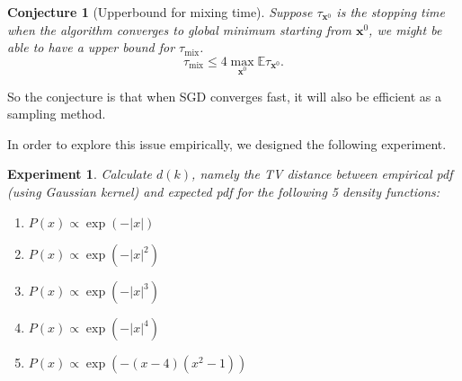 \documentclass[preprint,12pt,3p]{elsarticle}
\newcommand{\bx}{\mathbf{x}}
\newcommand{\E}{\mathbb{E}}
\newtheorem{conjecture}{Conjecture}
\newtheorem{experiment}{Experiment}
\begin{document}
\begin{conjecture}[Upperbound for mixing time] Suppose $\tau_{\bx^0}$ is the stopping time when the algorithm converges to global minimum starting from $\bx^0$, we might be able to have a upper bound for $\tau_{\mathrm{mix}}$.
\[
\tau_{\mathrm{mix}} \leq 4 \max_{\bx^0}\E \tau_{\bx^0}.
\]
\end{conjecture}

So the conjecture is that when SGD converges fast, it will also be efficient as a sampling method.

In order to explore this issue empirically, we designed the following experiment.
\begin{experiment}
Calculate $d(k)$, namely the TV distance between empirical pdf (using Gaussian kernel) and expected pdf for the following 5 density functions:
\begin{enumerate}
    \item $P(x) \propto \exp(- |x|)$
    \item $P(x) \propto \exp(- |x|^2)$
    \item $P(x) \propto \exp(- |x|^3)$
    \item $P(x) \propto \exp(- |x|^4)$
    \item $P(x) \propto \exp(- (x - 4)(x^2 - 1))$
\end{enumerate}
\end{experiment}
\end{document}
